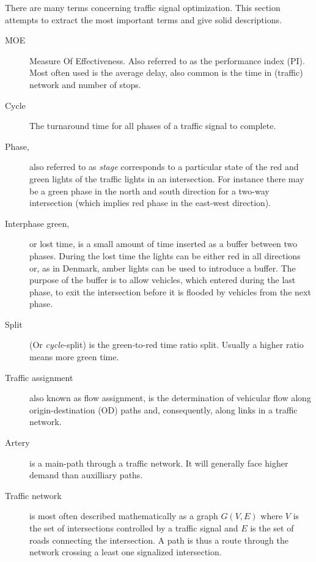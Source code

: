 \label{vocabulary}
There are many terms concerning traffic signal optimization. This section attempts to extract the most important terms and give solid descriptions.


\begin{description}

	\item[MOE] Measure Of Effectiveness. Also referred to as the performance index (PI).
	Most often used is the average delay, also common is the time in (traffic) network and number of stops. 
			
	\item[Cycle] The turnaround time for all phases of a traffic signal to complete.
	
	\item[Phase,] also referred to as \textit{stage} corresponds to a particular state of the red and green lights of the traffic lights in an intersection. 
	For instance there may be a green phase in the north and south direction for a two-way intersection (which implies red phase in the east-west direction).

\item[Interphase green,] or lost time, is a small amount of time inserted as a buffer between two phases. During the lost time the lights can be either red in all directions or, as in Denmark, amber lights can be used to introduce a buffer. The purpose of the buffer is to allow vehicles, which entered during the last phase, to exit the intersection before it is flooded by vehicles from the next phase.
	
	\item[Split] (Or \textit{cycle}-split) is the green-to-red time ratio split. Usually a higher ratio means more green time.
	
	\item[Traffic assignment] also known as flow assignment, is the determination of vehicular flow along origin-destination (OD) paths and, consequently, along links in a traffic network. 

\item[Artery] is a main-path through a traffic network. It will generally face higher demand than auxilliary paths.

\item[Traffic network] is most often described mathematically as a graph $G(V,E)$ where $V$ is the set of intersections controlled by a traffic signal and $E$ is the set of roads connecting the intersection. A path is thus a route through the network crossing a least one signalized intersection.


\end{description}
